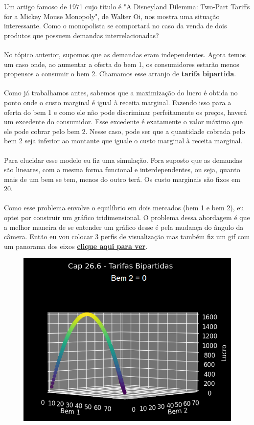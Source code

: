 \documentclass[a4paper,11pt,oneside]{book}
\theoremstyle{definition}
\theoremstyle{break}
\begin{document}
Um artigo famoso de 1971 cujo título é "A Disneyland Dilemma: Two-Part Tariffs for a Mickey Mouse Monopoly", de Walter Oi, nos mostra uma situação interessante. Como o monopolista se comportará no caso da venda de dois produtos que possuem demandas interrelacionadas?
\\~\\
No tópico anterior, supomos que as demandas eram independentes. Agora temos um caso onde, ao aumentar a oferta do bem 1, os consumidores estarão menos propensos a consumir o bem 2. Chamamos esse arranjo de \textbf{tarifa bipartida}.
\\~\\
Como já trabalhamos antes, sabemos que a maximização do lucro é obtida no ponto onde o custo marginal é igual à receita marginal. Fazendo isso para a oferta do bem 1 e como ele não pode discriminar perfeitamente os preços, haverá um excedente do consumidor. Esse excedente é exatamente o valor máximo que ele pode cobrar pelo bem 2. Nesse caso, pode ser que a quantidade cobrada pelo bem 2 seja inferior ao montante que iguale o custo marginal à receita marginal.
\\~\\
Para elucidar esse modelo eu fiz uma simulação. Fora suposto que as demandas são lineares, com a mesma forma funcional e interdependentes, ou seja, quanto mais de um bem se tem, menos do outro terá. Os custo marginais são fixos em 20.
\\~\\
Como esse problema envolve o equilíbrio em dois mercados (bem 1 e bem 2), eu optei por construir um gráfico tridimensional. O problema dessa abordagem é que a melhor maneira de se entender um gráfico desse é pela mudança do ângulo da câmera. Então eu vou colocar 3 perfis de visualização mas também fiz um gif com um panorama dos eixos \href{https://github.com/brunoruas2/Meus_Estudos/blob/main/Microeconomia/Microeconomics\%20-\%20Hal\%20Varian/images/cap26_6-tarifas_bipartidas.gif}{\textbf{clique aqui para ver}}.

\begin{figure}[H]
\centering
\includegraphics[scale=0.6]{cap26_6-tarifas_bipartidas1.png}
\end{figure}
\end{document}
